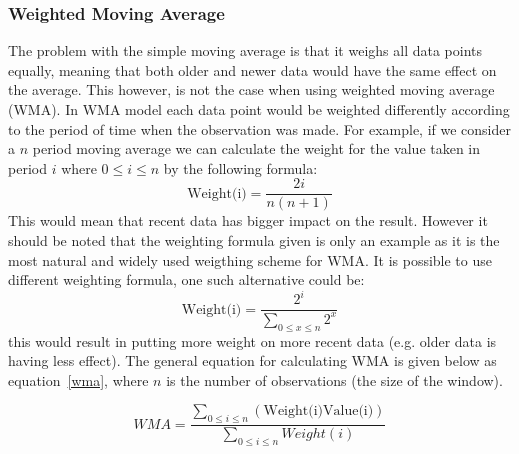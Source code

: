 \begin{figure}[ht]
	\caption{}
	\label{fig:cmaGraph}
\end{figure}

\FloatBarrier
\subsubsection{Weighted Moving Average}
The problem with the simple moving average is that it weighs all data points equally, meaning that both older and newer data would have the same effect on the average. This however, is not the case when using weighted moving average (WMA). In WMA model each data point would be weighted differently according to the period of time when the observation was made. For example, if we consider a $n$ period moving average we can calculate the weight for the value taken in period $i$ where $0\le i\le n$ by the following formula: \[\textrm{Weight(i)} = \frac{2i}{n(n+1)}\] This would mean that recent data has bigger impact on the result. However it should be noted that the weighting formula given is only an example as it is the most natural and widely used weigthing scheme for WMA. It is possible to use different weighting formula, one such alternative could be: \[\textrm{Weight(i)} = \frac{2^i}{\sum_{0\le x\le n}2^x}\] this would result in putting more weight on more recent data (e.g. older data is having less effect). The general equation for calculating WMA is given below as equation~\ref{wma}, where $n$ is the number of observations (the size of the window).

\begin{equation}\label{wma}
WMA = \frac{\sum_{0\le i\le n}(\textrm{Weight(i)}\textrm{Value(i)})}{\sum_{0\le i\le n}Weight(i)}
\end{equation}

